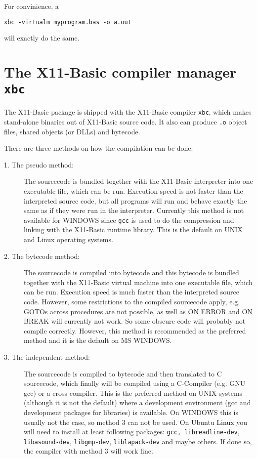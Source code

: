 For convinience, a
\begin{mdframed}[hidealllines=true,backgroundcolor=black!20]
\begin{verbatim}
xbc -virtualm myprogram.bas -o a.out
\end{verbatim}
\end{mdframed}
will exactly do the same. 
  
\section{The X11-Basic compiler manager {\tt \bf xbc}}

The X11-Basic package is shipped with the X11-Basic compiler \verb|xbc|, which
makes stand-alone binaries out of X11-Basic source code. It also can produce
\verb|.o| object files, shared objects (or DLLs) and bytecode. 

There are three methods on how the compilation can be done:
\begin{description}
\item[1. The pseudo method:] The sourcecode is bundled together with the
X11-Basic interpreter into one executable file, which can be run. Execution
speed is not faster than the interpreted source code, but all programs will run
and behave exactly the same as if they were run in the interpreter. Currently
this method is not available for WINDOWS since \verb|gcc| is used to do the
compression and linking with the X11-Basic runtime library. This is the default 
on UNIX and Linux operating systems.
\item[2. The bytecode method:] The sourcecode is compiled into bytecode and this
bytecode is bundled together with the X11-Basic virtual machine into one
executable file, which can be run. Execution speed is much faster than the
interpreted source code. However,
some restrictions to the compiled sourcecode apply, e.g. GOTOs across procedures
are not possible, as well as ON ERROR and ON BREAK will currently not work. So some
obscure code will probably not compile correctly. However, this method is
recommended as the preferred method and it is the default on MS WINDOWS.
\item[3. The independent method:] The sourcecode is compiled to bytecode and
then translated to C sourcecode, which finally will be compiled using a
C-Compiler (e.g. GNU gcc) or a cross-compiler. This is the preferred method on
UNIX systems (although it is not the default) where a development environment
(gcc and development packages for libraries) is available. On WINDOWS this is
usually not the case, so method 3 can not be used. On Ubuntu Linux you will need
to install at least following packages:  
\verb|gcc, libreadline-dev|, \verb|libasound-dev|, \verb|libgmp-dev|,  \verb|liblapack-dev|
and maybe others. If done so, the compiler with method 3 will work fine.
\end{description}

